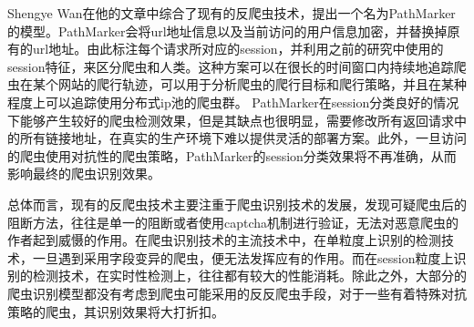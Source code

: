 \documentclass[doctor,privacy,twoside]{buaa_mac}
\begin{document}
  Shengye Wan在他的文章中综合了现有的反爬虫技术，提出一个名为PathMarker的模型。PathMarker会将url地址信息以及当前访问的用户信息加密，并替换掉原有的url地址。由此标注每个请求所对应的session，并利用之前的研究中使用的session特征，来区分爬虫和人类。这种方案可以在很长的时间窗口内持续地追踪爬虫在某个网站的爬行轨迹，可以用于分析爬虫的爬行目标和爬行策略，并且在某种程度上可以追踪使用分布式ip池的爬虫群。 PathMarker在session分类良好的情况下能够产生较好的爬虫检测效果，但是其缺点也很明显，需要修改所有返回请求中的所有链接地址，在真实的生产环境下难以提供灵活的部署方案。此外，一旦访问的爬虫使用对抗性的爬虫策略，PathMarker的session分类效果将不再准确，从而影响最终的爬虫识别效果。

  总体而言，现有的反爬虫技术主要注重于爬虫识别技术的发展，发现可疑爬虫后的阻断方法，往往是单一的阻断或者使用captcha机制进行验证，无法对恶意爬虫的作者起到威慑的作用。在爬虫识别技术的主流技术中，在单粒度上识别的检测技术，一旦遇到采用字段变异的爬虫，便无法发挥应有的作用。而在session粒度上识别的检测技术，在实时性检测上，往往都有较大的性能消耗。除此之外，大部分的爬虫识别模型都没有考虑到爬虫可能采用的反反爬虫手段，对于一些有着特殊对抗策略的爬虫，其识别效果将大打折扣。







\end{document}
